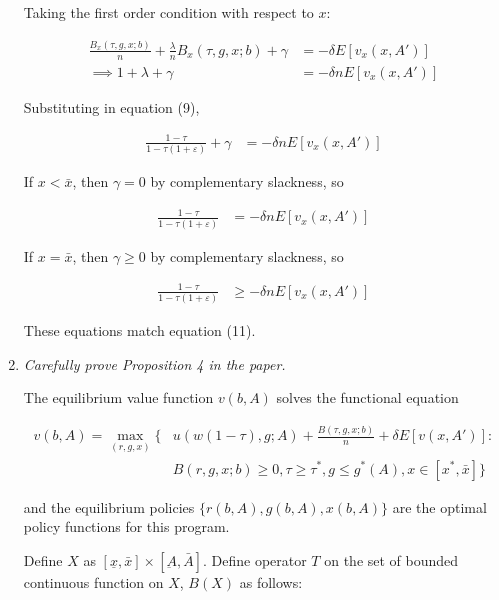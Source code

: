 \documentclass{article}
\newenvironment{manualtheorem}[1]{%
  \renewcommand\themanualtheoreminner{#1}%
  \manualtheoreminner
}{\endmanualtheoreminner}
\begin{document}
\begin{enumerate}
Taking the first order condition with respect to $x$:

\begin{align*}
\frac{B_x(\tau, g, x; b)}{n} + \frac{\lambda}{n} B_x(\tau, g, x;b) + \gamma  &= -\delta E[v_x(x, A')]\\
\implies
1 + \lambda + \gamma  &= -\delta  n E[v_x(x, A')]
\end{align*}

Substituting in equation (9),

\begin{align*}
\frac{1-\tau}{1- \tau (1+\varepsilon)  } + \gamma  &= -\delta  n E[v_x(x, A')]
\end{align*}

If $x < \bar x$, then $\gamma = 0$ by complementary slackness, so

\begin{align*}
\frac{1-\tau}{1- \tau (1+\varepsilon)  }  &= -\delta  n E[v_x(x, A')]
\end{align*}

If $x = \bar x$, then $\gamma \ge 0$ by complementary slackness, so

\begin{align*}
\frac{1-\tau}{1- \tau (1+\varepsilon)  }  &\ge -\delta  n E[v_x(x, A')]
\end{align*}

These equations match equation (11).

\pagebreak

\item \textit{Carefully prove Proposition 4 in the paper.}

\begin{manualtheorem}{4}
The equilibrium value function $v(b, A)$ solves the functional equation

\begin{align*}
v(b, A) = \max_{(r, g, x)} \Big \{ 
&u(w(1-\tau), g; A) + \frac{B(\tau, g, x; b)}{n} + \delta E[v(x, A')]:\\
& B(r, g, x; b) \ge 0, 
\tau \ge \tau^*,
g \le g^*(A),
x \in [x^*, \bar x]
\Big \}
\end{align*}

and the equilibrium policies $\{r(b, A), g(b, A), x(b, A)\}$ are the optimal policy functions for this program.

\end{manualtheorem}

Define $X$ as $[\underline x, \bar x] \times [\underbar A, \bar A]$. Define operator $T$ on the set of bounded continuous function on $X$, $B(X)$ as follows:


\end{enumerate}
\end{document}

